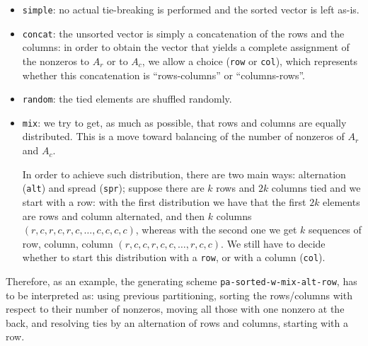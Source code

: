 \begin{enumerate}
 \begin{itemize}
  \item \verb|simple|: no actual tie-breaking is performed and the sorted vector is left as-is.
  \item \verb|concat|: the unsorted vector is simply a concatenation of the rows and the columns: in order to obtain the vector that yields a complete assignment of the nonzeros to $A_r$ or to $A_c$, we allow a choice (\verb|row| or \verb|col|), which represents whether this concatenation is ``rows-columns'' or ``columns-rows''. 
  
  \item \verb|random|: the tied elements are shuffled randomly.
  \item \verb|mix|: we try to get, as much as possible, that rows and columns are equally distributed. This is a move toward balancing of the number of nonzeros of $A_r$ and $A_c$. 
  
  In order to achieve such distribution, there are two main ways: alternation (\verb|alt|) and spread (\verb|spr|); suppose there are $k$ rows and $2k$ columns tied and we start with a row: with the first distribution we have that the first $2k$ elements are rows and column alternated, and then $k$ columns $(r,c,r,c,r,c,\dots,c,c,c,c)$, whereas with the second one we get $k$ sequences of row, column, column $(r,c,c,r,c,c,\dots,r,c,c)$. We still have to decide whether to start this distribution with a \verb|row|, or with a column (\verb|col|).
 \end{itemize}

Therefore, as an example, the generating scheme \verb|pa-sorted-w-mix-alt-row|, has to be interpreted as: using previous partitioning, sorting the rows/columns with respect to their number of nonzeros, moving all those with one nonzero at the back, and resolving ties by an alternation of rows and columns, starting with a row.
 
\end{enumerate}

